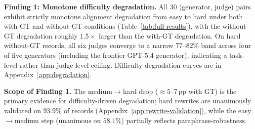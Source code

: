 \textbf{Finding 1: Monotone difficulty degradation.} All 30 (generator, judge) pairs exhibit strictly monotone alignment degradation from easy to hard under both with-GT and without-GT conditions (Table~\ref{tab:full-results}), with the without-GT degradation roughly $1.5\times$ larger than the with-GT degradation. On hard without-GT records, all six judges converge to a narrow $77$--$82\%$ band across four of five generators (including the frontier GPT-5.4 generator), indicating a task-level rather than judge-level ceiling. Difficulty degradation curves are in Appendix~\ref{app:degradation}.
\begin{table}[h]
\centering
\small
\setlength{\tabcolsep}{3pt}
\renewcommand{\arraystretch}{1.02}

\vspace{-0.1cm}
\caption{Full C3 results on Llama-3.3-70B generator. All values are mean alignment (\%) over 3,764--3,771 records per cell.
\textbf{cGT}: corrupted-GT condition. \textbf{Gemini}: Gemini 2.5 Pro.
\textbf{$\Delta_{\text{cGT-GT}}$}: corrupted-GT minus standard GT.
\textbf{$\Delta_{\text{cGT-noGT}}$}: corrupted-GT minus without GT.}
\vspace{-0.2cm}
\label{tab:c3-anchoring}

\end{table}
\textbf{Scope of Finding 1.} The medium$\to$hard drop (${\approx}5$--$7$\,pp with GT) is the primary evidence for difficulty-driven degradation; hard rewrites are unanimously validated on $93.9\%$ of records (Appendix~\ref{app:rewrite-validation}), while the easy$\to$medium step (unanimous on $58.1\%$) partially reflects paraphrase-robustness.


